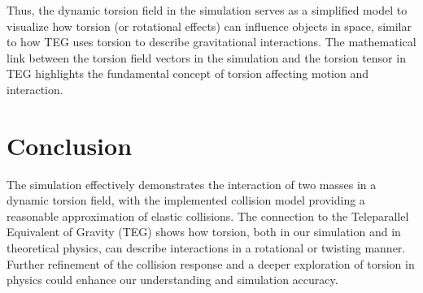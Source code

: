 \documentclass{article}
\begin{document}
Thus, the dynamic torsion field in the simulation serves as a simplified model to visualize how torsion (or rotational effects) can influence objects in space, similar to how TEG uses torsion to describe gravitational interactions. The mathematical link between the torsion field vectors in the simulation and the torsion tensor in TEG highlights the fundamental concept of torsion affecting motion and interaction.

\section{Conclusion}
The simulation effectively demonstrates the interaction of two masses in a dynamic torsion field, with the implemented collision model providing a reasonable approximation of elastic collisions. The connection to the Teleparallel Equivalent of Gravity (TEG) shows how torsion, both in our simulation and in theoretical physics, can describe interactions in a rotational or twisting manner. Further refinement of the collision response and a deeper exploration of torsion in physics could enhance our understanding and simulation accuracy.
\end{document}
